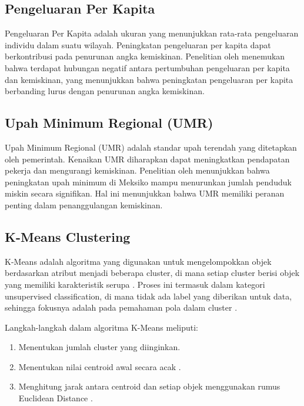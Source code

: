 \documentclass[12pt,a4paper]{article}
\begin{document}
\begin{multicols}{2}
\subsection{Pengeluaran Per Kapita}

Pengeluaran Per Kapita adalah ukuran yang menunjukkan rata-rata pengeluaran individu dalam suatu wilayah. Peningkatan pengeluaran per kapita dapat berkontribusi pada penurunan angka kemiskinan. Penelitian oleh \cite{muttaqin2025elastisitas} menemukan bahwa terdapat hubungan negatif antara pertumbuhan pengeluaran per kapita dan kemiskinan, yang menunjukkan bahwa peningkatan pengeluaran per kapita berbanding lurus dengan penurunan angka kemiskinan.

\subsection{Upah Minimum Regional (UMR)}

Upah Minimum Regional (UMR) adalah standar upah terendah yang ditetapkan oleh pemerintah. Kenaikan UMR diharapkan dapat meningkatkan pendapatan pekerja dan mengurangi kemiskinan. Penelitian oleh \cite{munguia2024minimum} menunjukkan bahwa peningkatan upah minimum di Meksiko mampu menurunkan jumlah penduduk miskin secara signifikan. Hal ini menunjukkan bahwa UMR memiliki peranan penting dalam penanggulangan kemiskinan.



\subsection{K-Means Clustering}
K-Means adalah algoritma yang digunakan untuk mengelompokkan objek berdasarkan atribut menjadi beberapa cluster, di mana setiap cluster berisi objek yang memiliki karakteristik serupa . Proses ini termasuk dalam kategori unsupervised classification, di mana tidak ada label yang diberikan untuk data, sehingga fokusnya adalah pada pemahaman pola dalam cluster .

Langkah-langkah dalam algoritma K-Means meliputi:

\begin{enumerate}
   \item Menentukan jumlah cluster yang diinginkan.

   \item Menentukan nilai centroid awal secara acak .

   \item Menghitung jarak antara centroid dan setiap objek menggunakan rumus Euclidean Distance .


\end{enumerate}
\end{multicols}
\end{document}
